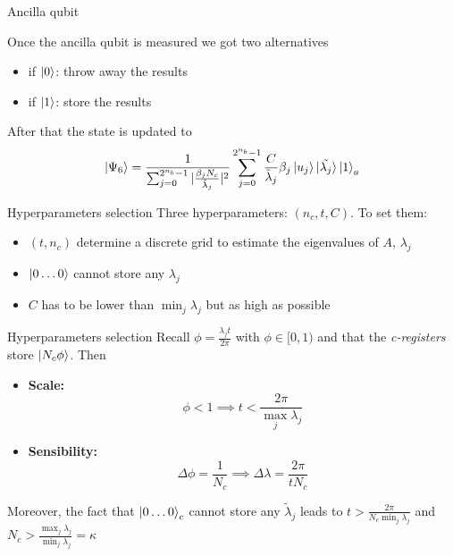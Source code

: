 \begin{frame}{Ancilla qubit}

    Once the ancilla qubit is measured we got two alternatives
    \begin{itemize}
        \item if $\ket{0}$: throw away the results
        \item if $\ket{1}$: store the results
    \end{itemize}
    \vspace{\baselineskip}
    After that the state is updated to 
    \begin{equation*}
        \ket{\Psi_6} = \frac{1}{\sum_{j=0}^{2^{n_b}-1} |\frac{\beta_j N_c}{\tilde{\lambda}_j}|^2}\sum_{j=0}^{2^{n_b}-1} \frac{C}{\tilde{\lambda}_j}\beta_j\ket{u_j}\ket{\tilde{\lambda_j}}\ket{1}_a
    \end{equation*}
\end{frame}

\begin{frame}{Hyperparameters selection}
    Three hyperparameters: $(n_c,t,C)$. To set them:\\
    \vspace{\baselineskip}
    \begin{itemize}
        \item $(t,n_c)$ determine a discrete grid to estimate the eigenvalues of $A$, $\lambda_j$
        \item $\ket{0\dots 0}$ cannot store any $\lambda_j$
        \item $C$ has to be lower than $\min_j \lambda_j$ but as high as possible
    \end{itemize}
\end{frame}

\begin{frame}{Hyperparameters selection}
    Recall $\phi = \frac{\lambda_j t}{2\pi}$ with $\phi \in [0,1)$ and that the \textit{c-registers} store $\ket{N_c\phi}$. Then \\
    \vspace{\baselineskip}
    \begin{itemize}
        \item \textbf{Scale:} 
        \begin{equation*}
            \phi < 1 \implies t < \frac{2\pi}{\max_j \lambda_j}
        \end{equation*}

        \item \textbf{Sensibility:}
        \begin{equation*}
            \Delta \phi = \frac{1}{N_c} \implies \Delta \lambda = \frac{2\pi}{tN_c}
        \end{equation*}
    \end{itemize}
    Moreover, the fact that $\ket{0\dots 0}_c$ cannot store any $\tilde{\lambda}_j$ leads to $t > \frac{2\pi}{N_c\min_j\lambda_j}$ and $N_c > \frac{\max_j \lambda_j}{\min_j \lambda_j}=\kappa$
\end{frame}


